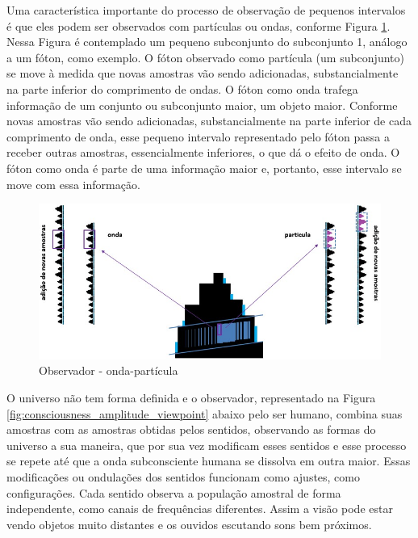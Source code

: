 Uma característica importante do processo de observação de pequenos intervalos é que eles podem ser observados com partículas ou ondas, conforme Figura \ref{fig:consciousness_space_wave-particle}. Nessa Figura é contemplado um pequeno subconjunto do subconjunto 1, análogo a um fóton, como exemplo. O fóton observado como partícula (um subconjunto) se move à medida que novas amostras vão sendo adicionadas, substancialmente na parte inferior do comprimento de ondas. O fóton como onda trafega informação de um conjunto ou subconjunto maior, um objeto maior. Conforme novas amostras vão sendo adicionadas, substancialmente na parte inferior de cada comprimento de onda, esse pequeno intervalo representado pelo fóton passa a receber outras amostras, essencialmente inferiores, o que dá o efeito de onda. O fóton como onda é parte de uma informação maior e, portanto, esse intervalo se move com essa informação.
	\begin{figure}[H]
	\caption{Observador - onda-partícula}
	\label{fig:consciousness_space_wave-particle}
	\centering
	\includegraphics[scale=.55]{sections/images/consciousness_space_wave-particle.jpg}
	\end{figure}
	
O universo não tem forma definida e o observador, representado na Figura \ref{fig:consciousness_amplitude_viewpoint} abaixo pelo ser humano, combina suas amostras com as amostras obtidas pelos sentidos, observando as formas do universo a sua maneira, que por sua vez modificam esses sentidos e esse processo se repete até que a onda subconsciente humana se dissolva em outra maior. Essas modificações ou ondulações dos sentidos funcionam como ajustes, como configurações. Cada sentido observa a população amostral de forma independente, como canais de frequências diferentes. Assim a visão pode estar vendo objetos muito distantes e os ouvidos escutando sons bem próximos.

